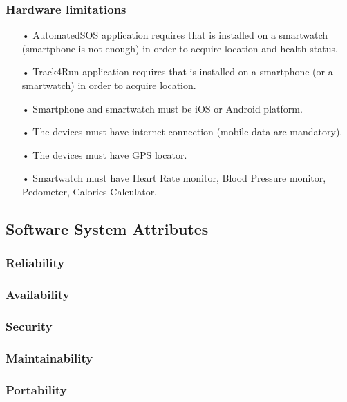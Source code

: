 \subsubsection{Hardware limitations}
\begin{enumerate} 
\item[•] AutomatedSOS application requires that is installed on a smartwatch (smartphone is not enough) in order to acquire location and health status.
\item[•] Track4Run application requires that is installed on a smartphone (or a smartwatch) in order to acquire location.
\item[•] Smartphone and smartwatch must be iOS or Android platform.
\item[•] The devices must have internet connection (mobile data are mandatory).
\item[•] The devices must have GPS locator.
\item[•] Smartwatch must have Heart Rate monitor, Blood Pressure monitor, Pedometer, Calories Calculator.
\end{enumerate}

\subsection{Software System Attributes}
\subsubsection{Reliability}
\subsubsection{Availability}
\subsubsection{Security}
\subsubsection{Maintainability}
\subsubsection{Portability}
